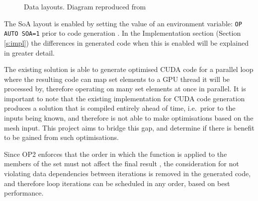 \begin{figure}[h]
  \centering

  \quad

  \caption{\label{fig:soa_v_aos} Data layouts. Diagram reproduced from \cite{gpudesign}}
\end{figure}

\noindent The SoA layout is enabled by setting the value of an environment variable: \verb|OP AUTO SOA=1| prior to code generation \cite[p13]{manual}. In the Implementation section (Section \ref{s:impl}) the differences in generated code when this is enabled will be explained in greater detail.
\par
The existing solution is able to generate optimised CUDA code for a parallel loop where the resulting code can map set elements to a GPU thread it will be processed by, therefore operating on many set elements at once in parallel. It is important to note that the existing implementation for CUDA code generation produces a solution that is compiled entirely ahead of time, i.e.\ prior to the inputs being known, and therefore is not able to make optimisations based on the mesh input. This project aims to bridge this gap, and determine if there is benefit to be gained from such optimisations.
\par
Since OP2 enforces that the order in which the function is applied to the members of the set must not affect the final result \cite[p4]{manual}, the consideration for not violating data dependencies between iterations is removed in the generated code, and therefore loop iterations can be scheduled in any order, based on best performance.

